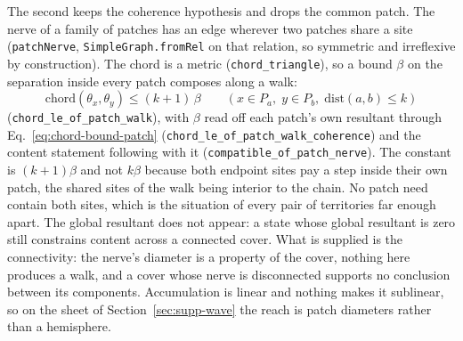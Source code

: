 \documentclass{article}
\begin{document}
The second keeps the coherence hypothesis and drops the common patch. The nerve
of a family of patches has an edge wherever two patches share a site
(\texttt{patchNerve}, \texttt{SimpleGraph.fromRel} on that relation, so symmetric
and irreflexive by construction). The chord is a metric
(\nolinkurl{chord_triangle}), so a bound $\beta$ on the separation
inside every patch composes along a walk:
\begin{equation}
 \mathrm{chord}(\theta_x,\theta_y)\le(k+1)\,\beta
 \qquad (x\in P_a,\; y\in P_b,\; \mathrm{dist}(a,b)\le k)
 \label{eq:chord-nerve}
\end{equation}
(\nolinkurl{chord_le_of_patch_walk}),
with $\beta$ read off each patch's own resultant through
Eq.~\eqref{eq:chord-bound-patch}
(\nolinkurl{chord_le_of_patch_walk_coherence})
and the content statement following with it
(\nolinkurl{compatible_of_patch_nerve}). The
constant is $(k+1)\beta$ and not $k\beta$ because both endpoint sites pay a step
inside their own patch, the shared sites of the walk being interior to the
chain. No patch need contain both sites, which is the situation of every pair of
territories far enough apart. The global resultant does not appear: a state
whose global resultant is zero still constrains content across a connected
cover. What is supplied is the connectivity: the nerve's diameter is a property
of the cover, nothing here produces a walk, and a cover whose nerve is
disconnected supports no conclusion between its components. Accumulation is
linear and nothing makes it sublinear, so on the sheet of Section~\ref{sec:supp-wave} the reach is \waveNerveDiameters{} patch
diameters rather than a hemisphere.
\end{document}
